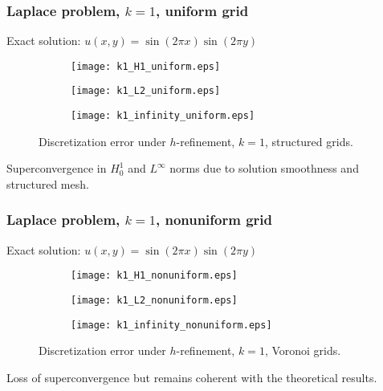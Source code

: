 \documentclass[10pt]{beamer}
\begin{document}
\begin{frame} \frametitle{Laplace problem, $k=1$, uniform grid}
	Exact solution: $u(x,y)=\sin(2\pi x) \sin(2 \pi y)$ 
\begin{figure}[H]
	\centering
	\begin{subfigure}{0.32\textwidth}
		\centering
		\texttt{[image: k1\_H1\_uniform.eps]}
		\label{fig:k1_H1_uniform}
	\end{subfigure}
	\begin{subfigure}{0.32\textwidth}
		\centering
		\texttt{[image: k1\_L2\_uniform.eps]}
		\label{fig:k1_L2_uniform}
	\end{subfigure}
	\begin{subfigure}{0.32\textwidth}
		\centering
		\texttt{[image: k1\_infinity\_uniform.eps]}
		\label{fig:k1_infinity_uniform}
	\end{subfigure}
		\caption{Discretization error under $h$-refinement, $k=1$, structured grids.}
	\label{fig:k1_uniform}
\end{figure}
	Superconvergence in $H_0^1$ and $L^\infty$ norms due to solution smoothness and structured mesh. \\
\end{frame}

\begin{frame} \frametitle{Laplace problem, $k=1$, nonuniform grid}
	Exact solution: $u(x,y)=\sin(2\pi x) \sin(2 \pi y)$
\begin{figure}[H]
	\centering
	\begin{subfigure}{0.32\textwidth}
		\centering
		\texttt{[image: k1\_H1\_nonuniform.eps]}
		\label{fig:k1_H1_nonuniform}
	\end{subfigure}
	\begin{subfigure}{0.32\textwidth}
		\centering
		\texttt{[image: k1\_L2\_nonuniform.eps]}
		\label{fig:k1_L2_nonuniform}
	\end{subfigure}
	\begin{subfigure}{0.32\textwidth}
		\centering
		\texttt{[image: k1\_infinity\_nonuniform.eps]}
		\label{fig:k1_infinity_nonuniform}
	\end{subfigure}
	\caption{Discretization error under $h$-refinement, $k=1$, Voronoi grids.}
	\label{fig:k1_nonuniform}
\end{figure}
	Loss of superconvergence but remains coherent with the theoretical results.
\end{frame}
\end{document}
